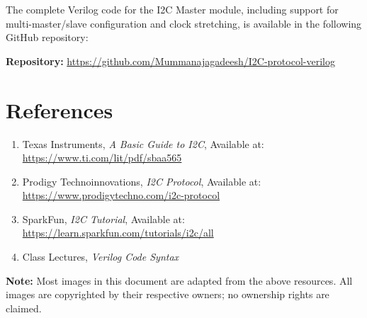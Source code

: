 \documentclass[a4paper,12pt]{report}
\begin{document}
The complete Verilog code for the I2C Master module, including support for multi-master/slave configuration and clock stretching, is available in the following GitHub repository:

\vspace{0.5cm}
\noindent
\textbf{Repository:} \url{https://github.com/Mummanajagadeesh/I2C-protocol-verilog}

\section{References}
\begin{enumerate}
    \item Texas Instruments, \emph{A Basic Guide to I2C}, Available at: \url{https://www.ti.com/lit/pdf/sbaa565}
    \item Prodigy Technoinnovations, \emph{I2C Protocol}, Available at: \url{https://www.prodigytechno.com/i2c-protocol}
    \item SparkFun, \emph{I2C Tutorial}, Available at: \url{https://learn.sparkfun.com/tutorials/i2c/all}
    \item Class Lectures, \emph{Verilog Code Syntax}
\end{enumerate}

\vspace{0.5cm}
\noindent \textbf{Note:} Most images in this document are adapted from the above resources. All images are copyrighted by their respective owners; no ownership rights are claimed.
\end{document}
